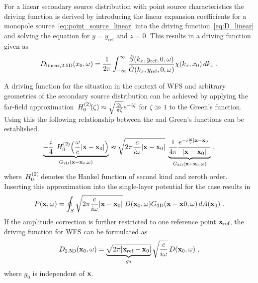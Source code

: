 For a linear secondary source distribution with point source characteristics the
\twohalfD driving function is derived by introducing the
linear expansion coefficients for a monopole
source~\eqref{eq:point_source_linear} into the driving
function~\eqref{eq:D_linear} and solving the equation for $y = y_\text{ref}$ and
$z = 0$. This results in a \twohalfD driving function given
as\autocite[][(3.77)]{Ahrens2012}
%
\begin{equation}
    D_{\text{linear},\twohalfD}(x_0,\omega) = \frac{1}{2\pi} \int_{-\infty}^\infty
    \frac{\breve{S}(k_x,y_\text{ref},0,\omega)}
    {\breve{G}(k_x,y_\text{ref},0,\omega)} \chi(k_x,x_0) \, dk_x \qp
    \label{eq:D_linear_25D}
\end{equation}
%

A driving function for the \twohalfD situation in the context of \ac{WFS}
and arbitrary \twoD geometries of the secondary source distribution
can be achieved by applying the
far-field approximation\autocite[][(4.23)]{Williams1999}
$\,H_{0}^{(2)}\!(\zeta) \approx \sqrt{\frac{2i}{\pi \zeta}}
e^{-i\zeta}$ for $\zeta \gg 1$ to the \twoD Green's function.
Using this the
following relationship between the \twoD and \threeD
Green's functions can be established.
%
\begin{multline} 
    \underbrace{
    -\frac{i}{4} \;\H{0}{2}\left(\omegac |\x-\x_0|\right)
    }_{G_\twoD(\x-\x_0,\omega)}
    \approx
    \sqrt{2\pi \frac{c}{i\omega} |\x-\x_0|} \;
    \underbrace{
        \frac{1}{4 \pi} \frac{e^{-i\omegac|\x-\x_0|}}{|\x-\x_0|}
    }_{G_\threeD(\x-\x_0,\omega)} \qc
\label{eq:25D_approximation}
\end{multline}
%
where $\,H_{0}^{(2)}\!$ denotes the Hankel function of second kind and zeroth
order.
Inserting this approximation into the single-layer potential for the \twoD
case results in
%
\begin{equation}
    P(\x,\omega) = \oint_S \sqrt{2\pi \frac{c}{i\omega} |\x-\x_0|} \;
    D(\x_0,\omega) G_\threeD(\x-\x0,\omega) \, dA(\x_0) \qp
    \label{eq:single_layer_potential_25D}
\end{equation}
%
If the amplitude correction is further restricted to one reference point
$\mathbf{x}_\text{ref}$, the \twohalfD driving function for \ac{WFS} can be formulated
as
%
\begin{equation}
    D_\twohalfD(\x_0,\omega) = \underbrace{\sqrt{2\pi |\x_\text{ref}-\x_0|}}_{g_0}
    \sqrt{\frac{c}{i\omega}} \,
    D(\x_0,\omega) \qc
    \label{eq:D25D_wfs}
\end{equation}
%
where $g_0$ is independent of $\mathbf{x}$.

